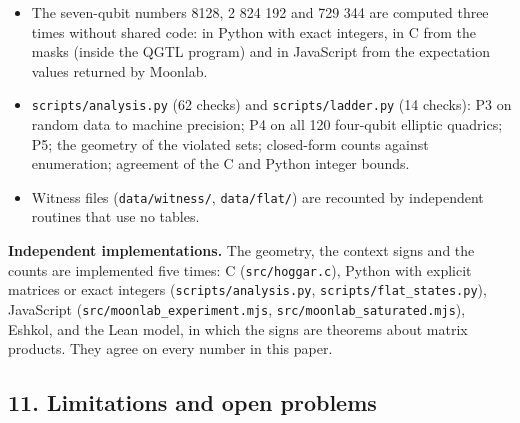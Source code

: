 \documentclass[11pt,a4paper]{article}
\begin{document}
\begin{itemize}
  \texttt{results/family7.log}. The two counts agree: 13 271 040 solutions found, and
  \(92\,897\,280/7 = 13\,271\,040\) for one orbit with a stabilizer of order 7.
\item
  The seven-qubit numbers 8128, 2 824 192 and 729 344 are computed three times without shared code: in
  Python with exact integers, in C from the masks (inside the QGTL program) and in JavaScript from the
  expectation values returned by Moonlab.
\item
  \texttt{scripts/analysis.py} (62 checks) and \texttt{scripts/ladder.py} (14 checks): P3 on random data to machine
  precision; P4 on all 120 four-qubit elliptic quadrics; P5; the geometry of the violated sets; closed-form
  counts against enumeration; agreement of the C and Python integer bounds.
\item
  Witness files (\texttt{data/witness/}, \texttt{data/flat/}) are recounted by independent routines that use no tables.
\end{itemize}

\textbf{Independent implementations.} The geometry, the context signs and the counts are implemented five
times: C (\texttt{src/hoggar.c}), Python with explicit matrices or exact integers (\texttt{scripts/analysis.py},
\texttt{scripts/flat\_states.py}), JavaScript (\texttt{src/moonlab\_experiment.mjs}, \texttt{src/moonlab\_saturated.mjs}),
Eshkol, and the Lean model, in which the signs are theorems about matrix products. They agree on every
number in this paper.

\subsection{11. Limitations and open problems}\label{11-limitations-and-open-problems}
\end{document}
